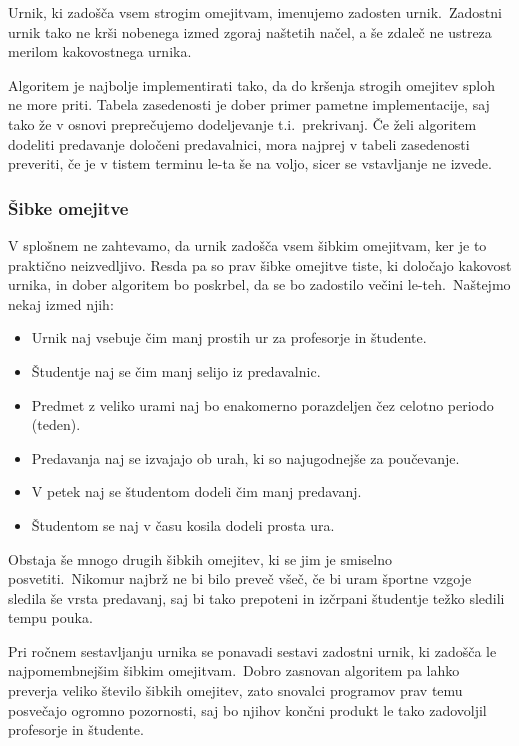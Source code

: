 \documentclass[a4paper,10pt]{article}
\begin{document}
\noindent Urnik, ki zadošča vsem strogim omejitvam, imenujemo zadosten urnik.\ Zadostni urnik tako ne
krši nobenega izmed zgoraj naštetih načel, a še zdaleč ne ustreza merilom kakovostnega urnika.

Algoritem je najbolje implementirati tako, da do kršenja strogih omejitev sploh ne more priti.
Tabela zasedenosti je dober primer pametne implementacije, saj tako že v osnovi  preprečujemo
dodeljevanje t.i.\ prekrivanj. Če želi algoritem dodeliti predavanje določeni predavalnici,
mora najprej v tabeli zasedenosti preveriti, če je v tistem terminu le-ta še na voljo,
sicer se vstavljanje ne izvede.

\subsubsection{Šibke omejitve}

V splošnem ne zahtevamo, da urnik zadošča vsem šibkim omejitvam, ker je to praktično neizvedljivo.
Resda pa so prav šibke omejitve tiste, ki določajo kakovost urnika, in dober algoritem bo
poskrbel, da se bo zadostilo večini le-teh.\ Naštejmo nekaj izmed njih:

\begin{itemize}
   \item Urnik naj vsebuje čim manj prostih ur za profesorje in študente.
   \item Študentje naj se čim manj selijo iz predavalnic.
   \item Predmet z veliko urami naj bo enakomerno porazdeljen čez celotno periodo (teden).
   \item Predavanja naj se izvajajo ob urah, ki so najugodnejše za poučevanje.
   \item V petek naj se študentom dodeli čim manj predavanj.
   \item Študentom se naj v času kosila dodeli prosta ura.
\end{itemize}

\noindent Obstaja še mnogo drugih šibkih omejitev, ki se jim je smiselno posvetiti.\ Nikomur najbrž ne
bi bilo preveč všeč, če bi uram športne vzgoje sledila še vrsta predavanj, saj bi tako
prepoteni in izčrpani študentje težko sledili tempu pouka.

Pri ročnem sestavljanju urnika se ponavadi sestavi zadostni urnik, ki zadošča le
najpomembnejšim šibkim omejitvam.\ Dobro zasnovan algoritem pa lahko preverja veliko
število šibkih omejitev, zato snovalci programov prav temu posvečajo ogromno pozornosti,
saj bo njihov končni produkt le tako zadovoljil profesorje in študente.
\end{document}
